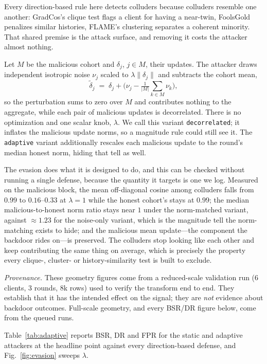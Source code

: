 Every direction-based rule here detects colluders because colluders resemble one
another: GradCos's clique test flags a client for having a near-twin, FoolsGold
penalizes similar histories, FLAME's clustering separates a coherent minority.
That shared premise is the attack surface, and removing it costs the attacker
almost nothing.

Let $M$ be the malicious cohort and $\delta_j$, $j\in M$, their updates. The
attacker draws independent isotropic noise $\nu_j$ scaled to $\lambda\|\delta_j\|$
and subtracts the cohort mean,
\begin{equation}
\label{eq:evasion}
\tilde\delta_j \;=\; \delta_j + \Big(\nu_j - \tfrac{1}{|M|}\textstyle\sum_{k\in M}\nu_k\Big),
\end{equation}
so the perturbation sums to zero over $M$ and contributes nothing to the
aggregate, while each pair of malicious updates is decorrelated. There is no
optimization and one scalar knob, $\lambda$. We call this variant
\texttt{decorrelated}; it inflates the malicious update norms, so a magnitude
rule could still see it. The \texttt{adaptive} variant additionally rescales each
malicious update to the round's median honest norm, hiding that tell as well.

The evasion does what it is designed to do, and this can be checked without
running a single defense, because the quantity it targets is one we log. Measured
on the malicious block, the mean off-diagonal cosine among colluders falls from
$0.99$ to $0.16$--$0.33$ at $\lambda=1$ while the honest cohort's stays at
$0.99$; the median malicious-to-honest norm ratio stays near $1$ under the
norm-matched variant, against $\approx1.23$ for the noise-only variant, which is
the magnitude tell the norm-matching exists to hide; and the malicious mean
update---the component the backdoor rides on---is preserved. The colluders stop looking like each other and keep
contributing the same thing on average, which is precisely the property every
clique-, cluster- or history-similarity test is built to exclude.

\emph{Provenance.} These geometry figures come from a reduced-scale validation
run (6 clients, 3 rounds, 8k rows) used to verify the transform end to end. They
establish that it has the intended effect on the signal; they are \emph{not}
evidence about backdoor outcomes. Full-scale geometry, and every BSR/DR figure
below, come from the queued runs. \PENDING

Table~\ref{tab:adaptive} reports BSR, DR and FPR for the static and adaptive
attackers at the headline point against every direction-based defense, and
Fig.~\ref{fig:evasion} sweeps $\lambda$. \PENDING

